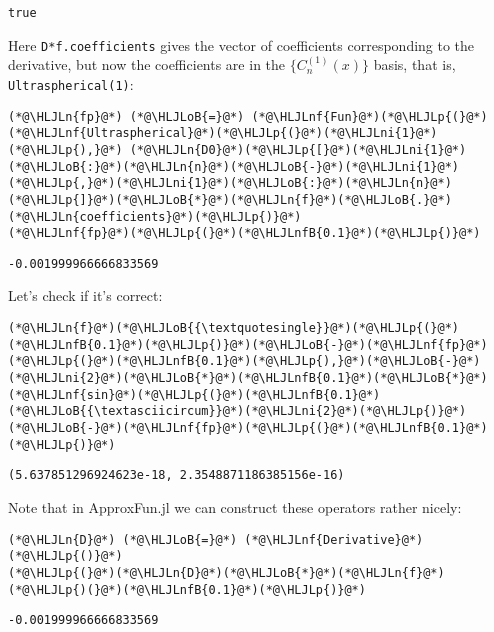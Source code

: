 \documentclass[12pt,landscape]{article}
\newcommand{\HLJLn}[1]{#1}
\newcommand{\HLJLnf}[1]{\textcolor[RGB]{66,102,213}{#1}}
\newcommand{\HLJLnfB}[1]{\textcolor[RGB]{59,151,46}{#1}}
\newcommand{\HLJLni}[1]{\textcolor[RGB]{59,151,46}{#1}}
\newcommand{\HLJLoB}[1]{\textcolor[RGB]{102,102,102}{\textbf{#1}}}
\newcommand{\HLJLp}[1]{#1}
\begin{document}
{\begin{lstlisting}
true
\end{lstlisting}


Here \texttt{D*f.coefficients} gives the vector of coefficients corresponding to the derivative, but now the coefficients are in the $\lbrace C_n^{(1)}(x)\rbrace$ basis, that is, \texttt{Ultraspherical(1)}:


\begin{lstlisting}
(*@\HLJLn{fp}@*) (*@\HLJLoB{=}@*) (*@\HLJLnf{Fun}@*)(*@\HLJLp{(}@*)(*@\HLJLnf{Ultraspherical}@*)(*@\HLJLp{(}@*)(*@\HLJLni{1}@*)(*@\HLJLp{),}@*) (*@\HLJLn{D0}@*)(*@\HLJLp{[}@*)(*@\HLJLni{1}@*)(*@\HLJLoB{:}@*)(*@\HLJLn{n}@*)(*@\HLJLoB{-}@*)(*@\HLJLni{1}@*)(*@\HLJLp{,}@*)(*@\HLJLni{1}@*)(*@\HLJLoB{:}@*)(*@\HLJLn{n}@*)(*@\HLJLp{]}@*)(*@\HLJLoB{*}@*)(*@\HLJLn{f}@*)(*@\HLJLoB{.}@*)(*@\HLJLn{coefficients}@*)(*@\HLJLp{)}@*)
(*@\HLJLnf{fp}@*)(*@\HLJLp{(}@*)(*@\HLJLnfB{0.1}@*)(*@\HLJLp{)}@*)
\end{lstlisting}

\begin{lstlisting}
-0.001999966666833569
\end{lstlisting}


Let's check if it's correct:


\begin{lstlisting}
(*@\HLJLn{f}@*)(*@\HLJLoB{{\textquotesingle}}@*)(*@\HLJLp{(}@*)(*@\HLJLnfB{0.1}@*)(*@\HLJLp{)}@*)(*@\HLJLoB{-}@*)(*@\HLJLnf{fp}@*)(*@\HLJLp{(}@*)(*@\HLJLnfB{0.1}@*)(*@\HLJLp{),}@*)(*@\HLJLoB{-}@*)(*@\HLJLni{2}@*)(*@\HLJLoB{*}@*)(*@\HLJLnfB{0.1}@*)(*@\HLJLoB{*}@*)(*@\HLJLnf{sin}@*)(*@\HLJLp{(}@*)(*@\HLJLnfB{0.1}@*)(*@\HLJLoB{{\textasciicircum}}@*)(*@\HLJLni{2}@*)(*@\HLJLp{)}@*)(*@\HLJLoB{-}@*)(*@\HLJLnf{fp}@*)(*@\HLJLp{(}@*)(*@\HLJLnfB{0.1}@*)(*@\HLJLp{)}@*)
\end{lstlisting}

\begin{lstlisting}
(5.637851296924623e-18, 2.3548871186385156e-16)
\end{lstlisting}


Note that in ApproxFun.jl we can construct these operators rather nicely:


\begin{lstlisting}
(*@\HLJLn{D}@*) (*@\HLJLoB{=}@*) (*@\HLJLnf{Derivative}@*)(*@\HLJLp{()}@*)
(*@\HLJLp{(}@*)(*@\HLJLn{D}@*)(*@\HLJLoB{*}@*)(*@\HLJLn{f}@*)(*@\HLJLp{)(}@*)(*@\HLJLnfB{0.1}@*)(*@\HLJLp{)}@*)
\end{lstlisting}

\begin{lstlisting}
-0.001999966666833569
\end{lstlisting}


}
\end{document}
